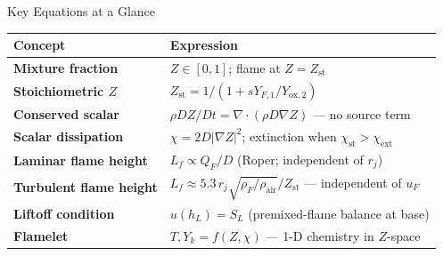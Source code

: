 \documentclass[12pt,aspectratio=169]{beamer}
\newcommand{\Zst}{Z_{\text{st}}}
\newcommand{\chist}{\chi_{\text{st}}}
\newcommand{\chiext}{\chi_{\text{ext}}}
\newcommand{\SL}{S_L}
\newcommand{\Lf}{L_f}
\begin{document}
\begin{frame}{Key Equations at a Glance}
  \renewcommand{\arraystretch}{1.6}
  \begin{tabular}{>{\bfseries}p{4.0cm} p{7.5cm}}
    \toprule
    Concept & Expression \\
    \midrule
    Mixture fraction & $Z \in [0,1]$; flame at $Z = \Zst$ \\
    Stoichiometric $Z$ & $\Zst = 1/(1 + sY_{F,1}/Y_{\text{ox},2})$ \\
    Conserved scalar & $\rho DZ/Dt = \nabla\cdot(\rho D\nabla Z)$ ---
                       no source term \\
    Scalar dissipation & $\chi = 2D|\nabla Z|^2$; extinction when
                         $\chist > \chiext$ \\
    Laminar flame height & $\Lf \propto Q_F/D$
                           (Roper; independent of $r_j$) \\
    Turbulent flame height &
      $\Lf \approx 5.3\,r_j\sqrt{\rho_F/\rho_{\text{air}}}/\Zst$ ---
      independent of $u_F$ \\
    Liftoff condition & $u(h_L) = \SL$
                        (premixed-flame balance at base) \\
    Flamelet & $T,Y_k = f(Z,\chi)$ --- 1-D chemistry in $Z$-space \\
    \bottomrule
  \end{tabular}
\end{frame}
\end{document}
